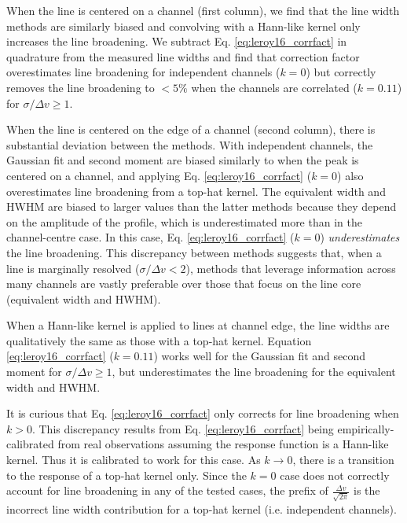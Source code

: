 \documentclass{rnaastex}
\begin{document}
When the line is centered on a channel (first column), we find that the line width methods are similarly biased and convolving with a Hann-like kernel only increases the line broadening.  We subtract Eq. \ref{eq:leroy16_corrfact} in quadrature from the measured line widths and find that correction factor overestimates line broadening for independent channels ($k=0$) but correctly removes the line broadening to $<5\%$ when the channels are correlated ($k=0.11$) for $\sigma/\Delta v \geq 1$.

When the line is centered on the edge of a channel (second column), there is substantial deviation between the methods. With independent channels, the Gaussian fit and second moment are biased similarly to when the peak is centered on a channel, and applying Eq. \ref{eq:leroy16_corrfact} ($k=0$) also overestimates line broadening from a top-hat kernel.  The equivalent width and HWHM are biased to larger values than the latter methods because they depend on the amplitude of the profile, which is underestimated more than in the channel-centre case.  In this case, Eq. \ref{eq:leroy16_corrfact} ($k=0$) {\it underestimates} the line broadening. This discrepancy between methods suggests that, when a line is marginally resolved ($\sigma / \Delta v < 2$), methods that leverage information across many channels are vastly preferable over those that focus on the line core (equivalent width and HWHM).

When a Hann-like kernel is applied to lines at channel edge, the line widths are qualitatively the same as those with a top-hat kernel.  Equation \ref{eq:leroy16_corrfact} ($k=0.11$) works well for the Gaussian fit and second moment for $\sigma/\Delta v \geq 1$, but underestimates the line broadening for the equivalent width and HWHM.

It is curious that Eq. \ref{eq:leroy16_corrfact} only corrects for line broadening when $k\gt0$.  This discrepancy results from Eq. \ref{eq:leroy16_corrfact} being empirically-calibrated from real observations assuming the response function is a Hann-like kernel.  Thus it is calibrated to work for this case.  As $k\rightarrow0$, there is a transition to the response of a top-hat kernel only.  Since the $k=0$ case does not correctly account for line broadening in any of the tested cases, the prefix of $\frac{\Delta v}{\sqrt{2\pi}}$ is the incorrect line width contribution for a top-hat kernel (i.e. independent channels).
\end{document}
